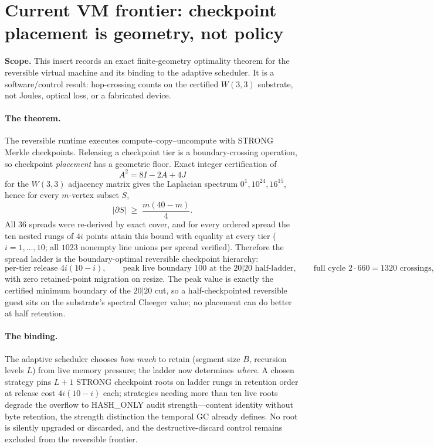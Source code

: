 \section*{Current VM frontier: checkpoint placement is geometry, not policy}

\noindent\textbf{Scope.}
This insert records an exact finite-geometry optimality theorem for the reversible
virtual machine and its binding to the adaptive scheduler.  It is a software/control
result: hop-crossing counts on the certified $W(3,3)$ substrate, not Joules, optical
loss, or a fabricated device.

\paragraph{The theorem.}
The reversible runtime executes compute--copy--uncompute with STRONG Merkle
checkpoints.  Releasing a checkpoint tier is a boundary-crossing operation, so
checkpoint \emph{placement} has a geometric floor.  Exact integer certification of
\[
A^2 = 8I - 2A + 4J
\]
for the $W(3,3)$ adjacency matrix gives the Laplacian spectrum $0^1,10^{24},16^{15}$,
hence for every $m$-vertex subset $S$,
\[
|\partial S| \;\ge\; \frac{m(40-m)}{4}.
\]
All $36$ spreads were re-derived by exact cover, and for every ordered spread the ten
nested rungs of $4i$ points attain this bound with equality at every tier
($i=1,\dots,10$; all $1023$ nonempty line unions per spread verified).  Therefore the
spread ladder is the boundary-optimal reversible checkpoint hierarchy:
\[
\boxed{
\text{per-tier release } 4i(10-i),\qquad
\text{peak live boundary } 100 \text{ at the } 20|20 \text{ half-ladder},\qquad
\text{full cycle } 2\cdot 660 = 1320 \text{ crossings},
}
\]
with zero retained-point migration on resize.  The peak value is exactly the certified
minimum boundary of the $20|20$ cut, so a half-checkpointed reversible guest sits on
the substrate's spectral Cheeger value; no placement can do better at half retention.

\paragraph{The binding.}
The adaptive scheduler chooses \emph{how much} to retain (segment size $B$, recursion
levels $L$) from live memory pressure; the ladder now determines \emph{where}.  A
chosen strategy pins $L{+}1$ STRONG checkpoint roots on ladder rungs in retention
order at release cost $4i(10-i)$ each; strategies needing more than ten live roots
degrade the overflow to HASH\_ONLY audit strength---content identity without byte
retention, the strength distinction the temporal GC already defines.  No root is
silently upgraded or discarded, and the destructive-discard control remains excluded
from the reversible frontier.

